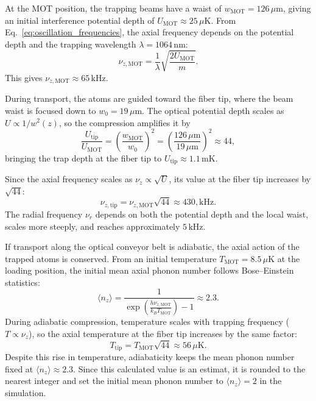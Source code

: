 At the MOT position, the trapping beams have a waist of $w_{\mathrm{MOT}} = 126\,\mu\mathrm{m}$, giving an initial interference potential depth of $U_{\mathrm{MOT}} \approx 25\,\mu\mathrm{K}$. From Eq.~\eqref{eq:oscillation_frequencies}, the axial frequency depends on the potential depth and the trapping wavelength $\lambda = 1064\,\mathrm{nm}$:
\begin{equation}
\nu_{z,\mathrm{MOT}} = \frac{1}{\lambda}\sqrt{\frac{2U_{\mathrm{MOT}}}{m}}.
\end{equation}
This gives $\nu_{z,\mathrm{MOT}} \approx 65\,\mathrm{kHz}$.

During transport, the atoms are guided toward the fiber tip, where the beam waist is focused down to $w_0 = 19\,\mu\mathrm{m}$. The optical potential depth scales as $U \propto 1/w^2(z)$, so the compression amplifies it by
\begin{equation}
\frac{U_{\mathrm{tip}}}{U_{\mathrm{MOT}}} = \left(\frac{w_{\mathrm{MOT}}}{w_0}\right)^2 = \left(\frac{126\,\mu\mathrm{m}}{19\,\mu\mathrm{m}}\right)^2 \approx 44,
\end{equation}
bringing the trap depth at the fiber tip to $U_{\mathrm{tip}} \approx 1.1\,\mathrm{mK}$.

Since the axial frequency scales as $\nu_z \propto \sqrt{U}$, its value at the fiber tip increases by $\sqrt{44}$:
\begin{equation}
\nu_{z,\mathrm{tip}} = \nu_{z,\mathrm{MOT}}\sqrt{44} \approx 430,\mathrm{kHz}.
\end{equation}
The radial frequency $\nu_r$ depends on both the potential depth and the local waist, scales more steeply, and reaches approximately $5\,\mathrm{kHz}$.

If transport along the optical conveyor belt is adiabatic, the axial action of the trapped atoms is conserved. From an initial temperature $T_{\mathrm{MOT}} = 8.5\,\mu\mathrm{K}$ at the loading position, the initial mean axial phonon number follows Bose--Einstein statistics:
\begin{equation}
\langle n_{z} \rangle = \frac{1}{\exp\left(\frac{h\nu_{z,\mathrm{MOT}}}{k_B T_{\mathrm{MOT}}}\right) - 1} \approx 2.3.
\end{equation}
During adiabatic compression, temperature scales with trapping frequency ($T \propto \nu_z$), so the axial temperature at the fiber tip increases by the same factor:
\begin{equation}
T_{\mathrm{tip}} = T_{\mathrm{MOT}}\sqrt{44} \approx 56\,\mu\mathrm{K}.
\end{equation}
Despite this rise in temperature, adiabaticity keeps the mean phonon number fixed at $\langle n_{z} \rangle \approx 2.3$. Since this calculated value is an estimat, it is rounded to the nearest integer and set the initial mean phonon number to $\langle n_{z} \rangle = 2$ in the simulation.

